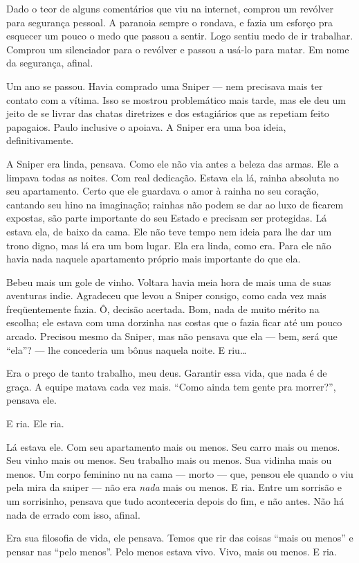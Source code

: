 Dado o teor de alguns comentários que viu na internet, comprou um revólver para segurança pessoal. A paranoia sempre o rondava, e fazia um esforço pra esquecer um pouco o medo que passou a sentir. Logo sentiu medo de ir trabalhar. Comprou um silenciador para o revólver e passou a usá-lo para matar. Em nome da segurança, afinal.

Um ano se passou. Havia comprado uma Sniper --- nem precisava mais ter contato com a vítima. Isso se mostrou problemático mais tarde, mas ele deu um jeito de se livrar das chatas diretrizes e dos estagiários que as repetiam feito papagaios. Paulo inclusive o apoiava. A Sniper era uma boa ideia, definitivamente.

A Sniper era linda, pensava. Como ele não via antes a beleza das armas. Ele a limpava todas as noites. Com real dedicação. Estava ela lá, rainha absoluta no seu apartamento. Certo que ele guardava o amor à rainha no seu coração, cantando seu hino na imaginação; rainhas não podem se dar ao luxo de ficarem expostas, são parte importante do seu Estado e precisam ser protegidas. Lá estava ela, de baixo da cama. Ele não teve tempo nem ideia para lhe dar um trono digno, mas lá era um bom lugar. Ela era linda, como era. Para ele não havia nada naquele apartamento próprio mais importante do que ela.

Bebeu mais um gole de vinho. Voltara havia meia hora de mais uma de suas aventuras indie. Agradeceu que levou a Sniper consigo, como cada vez mais freqüentemente fazia. Ô, decisão acertada. Bom, nada de muito mérito na escolha; ele estava com uma dorzinha nas costas que o fazia ficar até um pouco arcado. Precisou mesmo da Sniper, mas não pensava que ela --- bem, será que ``ela''? --- lhe concederia um bônus naquela noite. E riu\ldots 

Era o preço de tanto trabalho, meu deus. Garantir essa vida, que nada é de graça. A equipe matava cada vez mais. ``Como ainda tem gente pra morrer?'', pensava ele.

E ria. Ele ria.

Lá estava ele. Com seu apartamento mais ou menos. Seu carro mais ou menos. Seu vinho mais ou menos. Seu trabalho mais ou menos. Sua vidinha mais ou menos. Um corpo feminino nu na cama --- morto --- que, pensou ele quando o viu pela mira da sniper --- não era \emph{nada} mais ou menos. E ria. Entre um sorrisão e um sorrisinho, pensava que tudo aconteceria depois do fim, e não antes. Não há nada de errado com isso, afinal.

Era sua filosofia de vida, ele pensava. Temos que rir das coisas ``mais ou menos'' e pensar nas ``pelo menos''. Pelo menos estava vivo. Vivo, mais ou menos. E ria.
